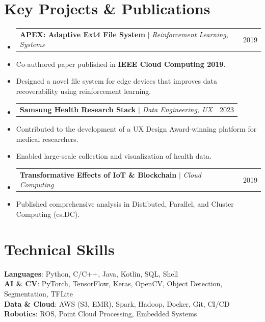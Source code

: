 \documentclass[a4paper,10pt]{article}
\makeatletter
\newcommand{\resumeItem}[1]{
  \item\small{#1 \vspace{-2pt}}
}
\newcommand{\resumeProjectHeading}[2]{
    \item
    \begin{tabular*}{0.97\textwidth}{l@{\extracolsep{\fill}}r}
      \small#1 & #2 \\
    \end{tabular*}\vspace{-5pt}
}
\makeatother
\begin{document}
\section{Key Projects \& Publications}
  \begin{itemize}[leftmargin=0.15in, label={}]

    \resumeProjectHeading
      {\textbf{APEX: Adaptive Ext4 File System} $|$ \emph{Reinforcement Learning, Systems}}{2019}
      \resumeItem{Co-authored paper published in \textbf{IEEE Cloud Computing 2019}.}
      \resumeItem{Designed a novel file system for edge devices that improves data recoverability using reinforcement learning.}

    \resumeProjectHeading
      {\textbf{Samsung Health Research Stack} $|$ \emph{Data Engineering, UX}}{2023}
      \resumeItem{Contributed to the development of a UX Design Award-winning platform for medical researchers.}
      \resumeItem{Enabled large-scale collection and visualization of health data.}

    \resumeProjectHeading
      {\textbf{Transformative Effects of IoT \& Blockchain} $|$ \emph{Cloud Computing}}{2019}
      \resumeItem{Published comprehensive analysis in Distibuted, Parallel, and Cluster Computing (cs.DC).}

  \end{itemize}


\section{Technical Skills}
 \begin{itemize}[leftmargin=0.15in, label={}]
    \small{\item{
     \textbf{Languages}{: Python, C/C++, Java, Kotlin, SQL, Shell} \\
     \textbf{AI \& CV}{: PyTorch, TensorFlow, Keras, OpenCV, Object Detection, Segmentation, TFLite} \\
     \textbf{Data \& Cloud}{: AWS (S3, EMR), Spark, Hadoop, Docker, Git, CI/CD} \\
     \textbf{Robotics}{: ROS, Point Cloud Processing, Embedded Systems}
    }}
 \end{itemize}
\end{document}
